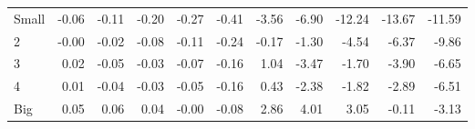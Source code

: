 \begin{table}[!ht]
\begin{tabular}{lrrrrrrrrrr}
    \\
      \cmidrule(r){2-6} \cmidrule(r){7-11}

    Small   & -0.06  & -0.11  & -0.20  & -0.27  & -0.41  & -3.56  & -6.90  & -12.24  & -13.67  & -11.59  \\
         2  & -0.00  & -0.02  & -0.08  & -0.11  & -0.24  & -0.17  & -1.30  & -4.54  & -6.37  & -9.86  \\
         3  & 0.02  & -0.05  & -0.03  & -0.07  & -0.16  & 1.04  & -3.47  & -1.70  & -3.90  & -6.65  \\
         4  & 0.01  & -0.04  & -0.03  & -0.05  & -0.16  & 0.43  & -2.38  & -1.82  & -2.89  & -6.51  \\
    Big     & 0.05  & 0.06  & 0.04  & -0.00  & -0.08  & 2.86  & 4.01  & 3.05  & -0.11  & -3.13  \\

  

  \bottomrule
\end{tabular}
\label{tbl:25_Size_Var_C1997}
\end{table}